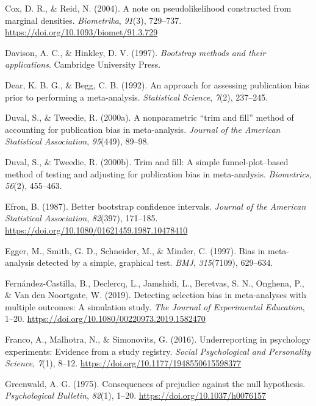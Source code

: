 \documentclass[
  man, donotrepeattitle,floatsintext]{apa7}
\newlength{\cslhangindent}
\newenvironment{CSLReferences}[2] %
 {\begin{list}{}{%
  \setlength{\itemindent}{0pt}
  \setlength{\leftmargin}{0pt}
  \setlength{\parsep}{0pt}
  \ifodd #1
   \setlength{\leftmargin}{\cslhangindent}
   \setlength{\itemindent}{-1\cslhangindent}
  \fi
  \setlength{\itemsep}{#2\baselineskip}}}
 {\end{list}}
\begin{document}
\begin{CSLReferences}{1}{0}
Cox, D. R., \& Reid, N. (2004). A note on pseudolikelihood constructed from marginal densities. \emph{Biometrika}, \emph{91}(3), 729--737. \url{https://doi.org/10.1093/biomet/91.3.729}

Davison, A. C., \& Hinkley, D. V. (1997). \emph{Bootstrap methods and their applications}. Cambridge University Press.

Dear, K. B. G., \& Begg, C. B. (1992). {An approach for assessing publication bias prior to performing a meta-analysis}. \emph{Statistical Science}, \emph{7}(2), 237--245.

Duval, S., \& Tweedie, R. (2000a). A nonparametric {``trim and fill''} method of accounting for publication bias in meta-analysis. \emph{Journal of the American Statistical Association}, \emph{95}(449), 89--98.

Duval, S., \& Tweedie, R. (2000b). Trim and fill: A simple funnel-plot--based method of testing and adjusting for publication bias in meta-analysis. \emph{Biometrics}, \emph{56}(2), 455--463.

Efron, B. (1987). Better bootstrap confidence intervals. \emph{Journal of the American Statistical Association}, \emph{82}(397), 171--185. \url{https://doi.org/10.1080/01621459.1987.10478410}

Egger, M., Smith, G. D., Schneider, M., \& Minder, C. (1997). Bias in meta-analysis detected by a simple, graphical test. \emph{BMJ}, \emph{315}(7109), 629--634.

Fernández-Castilla, B., Declercq, L., Jamshidi, L., Beretvas, S. N., Onghena, P., \& Van den Noortgate, W. (2019). Detecting selection bias in meta-analyses with multiple outcomes: A simulation study. \emph{The Journal of Experimental Education}, 1--20. \url{https://doi.org/10.1080/00220973.2019.1582470}

Franco, A., Malhotra, N., \& Simonovits, G. (2016). Underreporting in psychology experiments: Evidence from a study registry. \emph{Social Psychological and Personality Science}, \emph{7}(1), 8--12. \url{https://doi.org/10.1177/1948550615598377}

Greenwald, A. G. (1975). Consequences of prejudice against the null hypothesis. \emph{Psychological Bulletin}, \emph{82}(1), 1--20. \url{https://doi.org/10.1037/h0076157}


\end{CSLReferences}
\end{document}
